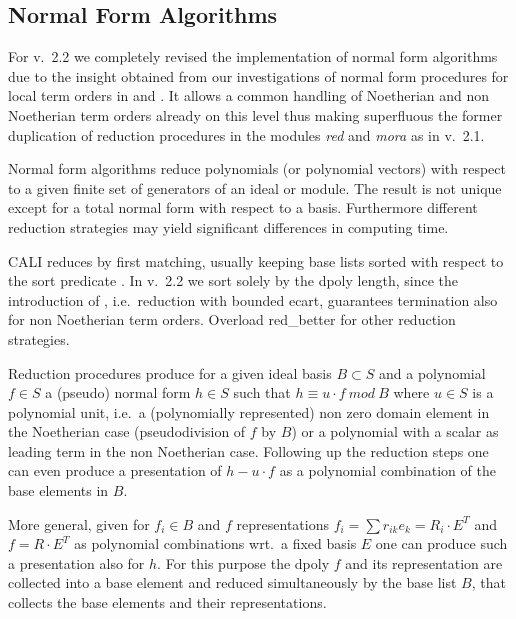 \subsection{Normal Form Algorithms}

For v.\ 2.2 we completely revised the implementation of normal form
algorithms due to the insight obtained from our investigations of
normal form procedures for local term orders in \cite{ala} and
\cite{tcah}. It allows a common handling of Noetherian and non
Noetherian term orders already on this level thus making superfluous
the former duplication of reduction procedures in the modules {\em
red} and {\em mora} as in v.\ 2.1.
\medskip

Normal form algorithms reduce polynomials (or polynomial vectors)
with respect to a given finite set of generators of an ideal or
module. The result is not unique except for a total normal form with
respect to a \gr basis. Furthermore different reduction strategies
may yield significant differences in computing time.

CALI reduces by first matching, usually keeping base lists sorted
with respect to the sort predicate . In v.\ 2.2 we
sort solely by the dpoly length, since the introduction of
, i.e.\ reduction with bounded ecart, guarantees
termination also for non Noetherian term orders. Overload red\_better
for other reduction strategies.
\medskip

Reduction procedures produce for a given ideal basis $B\subset S$ and
a polynomial $f\in S$ a (pseudo) normal form $h\in S$ such that
$h\equiv u\cdot f\ mod\ B$ where $u\in S$ is a polynomial unit, i.e.\
a (polynomially represented) non zero domain element in the Noetherian
case (pseudodivision of $f$ by $B$) or a polynomial with a scalar as
leading term in the non Noetherian case. Following up the reduction
steps one can even produce a presentation of $h-u\cdot f$ as a
polynomial combination of the base elements in $B$.

More general, given for $f_i\in B$ and $f$ representations $f_i =
\sum{r_{ik}e_k} = R_i\cdot E^T$ and $f=R\cdot E^T$ as polynomial
combinations wrt.\ a fixed basis $E$ one can produce such a
presentation also for $h$. For this purpose the dpoly $f$ and its
representation are collected into a base element and reduced
simultaneously by the base list $B$, that collects the base elements
and their representations.
\medskip

